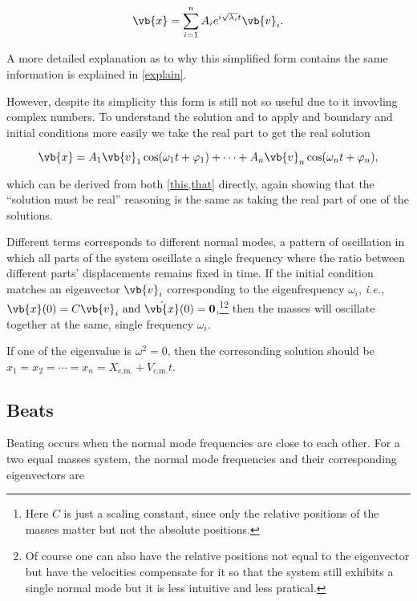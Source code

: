 \documentclass[a4paper,12pt]{report}
\begin{document}
\begin{equation}
	\vb{x} = \sum_{i=1}^{n} A_{i}e^{i \sqrt{\lambda _{i} }t }\vb{v} _{i}.   \label{this} 
\end{equation}

A more detailed explanation as to why this simplified form contains the same information is explained in \cref{explain}.

However, despite its simplicity this form is still not so useful due to it invovling complex numbers. To understand the solution and to apply and boundary and initial conditions more easily we take the real part to get the real solution 

\begin{equation}
	\vb{x} = A_1 \vb{v} _{1}\cos (\omega _{1}t+\varphi _{1}  ) + \cdots + A_{n} \vb{v} _{n} \cos (\omega _{n}t + \varphi _{n}  ),   \label{that} 
\end{equation}

which can be derived from both \cref{this,that} directly, again showing that the ``solution must be real'' reasoning is the same as taking the real part of one of the solutions.

Different terms corresponds to different normal modes, a pattern of oscillation in which all parts of the system oscillate a single frequency where the ratio between different parts' displacements remains fixed in time. If the initial condition matches an eigenvector \(\vb{v} _{i} \) corresponding to the eigenfrequency \(\omega _{i} \), \textit{i.e.,} \(\vb{x} (0) = C \vb{v} _{i} \text { and } \dot{\vb{x} }(0) = \boldsymbol{0}  \),\footnote{Here \(C\) is just a scaling constant, since only the relative positions of the masses matter but not the absolute positions.}\footnote{Of course one can also have the relative positions not equal to the eigenvector but have the velocities compensate for it so that the system still exhibits a single normal mode but it is less intuitive and less pratical.} then the masses will oscillate together at the same, single frequency \(\omega _{i} \).  

If one of the eigenvalue is \(\omega^2 = 0\), then the corresonding solution should be \(x_1 = x_2 = \cdots  = x_{n} = X_{\text{c.m.} } + V_{\text{c.m.} }t   \).   

\subsection{Beats}

Beating occurs when the normal mode frequencies are close to each other. For a two equal masses system, the normal mode frequencies and their corresponding eigenvectors are
\end{document}
